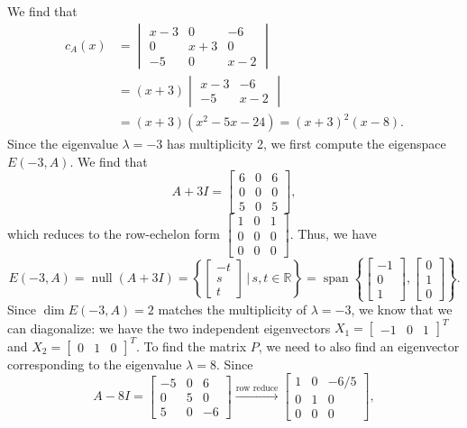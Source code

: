 \documentclass[letterpaper,12pt]{article}
\newcommand{\R}{\mathbb{R}}
\DeclareMathOperator{\nul}{null}
\DeclareMathOperator{\spn}{span}
\begin{document}
\begin{enumerate}
\begin{enumerate}
We find that
\begin{align*}
 c_A(x) &= \begin{vmatrix}x-3&0&-6\\0&x+3&0\\-5&0&x-2\end{vmatrix}\\
&=(x+3)\begin{vmatrix}x-3&-6\\-5&x-2\end{vmatrix}\\
&=(x+3)(x^2-5x-24)=(x+3)^2(x-8).
\end{align*}
Since the eigenvalue $\lambda = -3$ has multiplicity 2, we first compute the eigenspace $E(-3,A)$. We find that
\[
 A+3I = \begin{bmatrix}6&0&6\\0&0&0\\5&0&5\end{bmatrix},
\]
which reduces to the row-echelon form $\begin{bmatrix}1&0&1\\0&0&0\\0&0&0\end{bmatrix}$. Thus, we have
\[
 E(-3,A) = \nul(A+3I) = \left\{\begin{bmatrix}-t\\s\\t\end{bmatrix}\,|\, s,t\in\R\right\} = \spn\left\{\begin{bmatrix}-1\\0\\1\end{bmatrix},\begin{bmatrix}0\\1\\0\end{bmatrix}\right\}.
\]
Since $\dim E(-3,A) = 2$ matches the multiplicity of $\lambda = -3$, we know that we can diagonalize: we have the two independent eigenvectors $X_1 = \begin{bmatrix}-1&0&1\end{bmatrix}^T$ and $X_2=\begin{bmatrix}0&1&0\end{bmatrix}^T$. To find the matrix $P$, we need to also find an eigenvector corresponding to the eigenvalue $\lambda = 8$. Since
\[
 A-8I = \begin{bmatrix}-5&0&6\\0&5&0\\5&0&-6\end{bmatrix} \xrightarrow[]{\text{row reduce}} \begin{bmatrix}1&0&-6/5\\0&1&0\\0&0&0\end{bmatrix},
\]
\end{enumerate}
\end{enumerate}
\end{document}
